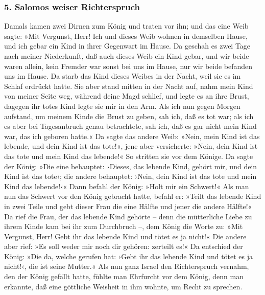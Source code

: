 \hypertarget{salomos-weiser-richterspruch}{%
\subsubsection{5. Salomos weiser
Richterspruch}\label{salomos-weiser-richterspruch}}

Damals kamen zwei Dirnen zum König und traten vor ihn;
und das eine Weib sagte: »Mit Vergunst, Herr! Ich und
dieses Weib wohnen in demselben Hause, und ich gebar ein Kind in ihrer
Gegenwart im Hause. Da geschah es zwei Tage nach meiner
Niederkunft, daß auch dieses Weib ein Kind gebar, und wir beide waren
allein, kein Fremder war sonst bei uns im Hause, nur wir beide befanden
uns im Hause. Da starb das Kind dieses Weibes in der
Nacht, weil sie es im Schlaf erdrückt hatte. Sie aber
stand mitten in der Nacht auf, nahm mein Kind von meiner Seite weg,
während deine Magd schlief, und legte es an ihre Brust, dagegen ihr
totes Kind legte sie mir in den Arm. Als ich nun gegen
Morgen aufstand, um meinem Kinde die Brust zu geben, sah ich, daß es tot
war; als ich es aber bei Tagesanbruch genau betrachtete, sah ich, daß es
gar nicht mein Kind war, das ich geboren hatte.« Da sagte
das andere Weib: »Nein, mein Kind ist das lebende, und dein Kind ist das
tote!«, jene aber versicherte: »Nein, dein Kind ist das tote und mein
Kind das lebende!« So stritten sie vor dem Könige. Da
sagte der König: »Die eine behauptet: ›Dieses, das lebende Kind, gehört
mir, und dein Kind ist das tote‹; die andere behauptet: ›Nein, dein Kind
ist das tote und mein Kind das lebende!‹« Dann befahl der
König: »Holt mir ein Schwert!« Als man nun das Schwert vor den König
gebracht hatte, befahl er: »Teilt das lebende Kind in
zwei Teile und gebt dieser Frau die eine Hälfte und jener die andere
Hälfte!« Da rief die Frau, der das lebende Kind gehörte
-- denn die mütterliche Liebe zu ihrem Kinde kam bei ihr zum Durchbruch
--, dem König die Worte zu: »Mit Vergunst, Herr! Gebt ihr das lebende
Kind und tötet es ja nicht!« Die andere aber rief: »Es soll weder mir
noch dir gehören: zerteilt es!« Da entschied der König:
»Die da, welche gerufen hat: ›Gebt ihr das lebende Kind und tötet es ja
nicht!‹, die ist seine Mutter.« Als nun ganz Israel den
Richterspruch vernahm, den der König gefällt hatte, fühlte man Ehrfurcht
vor dem König, denn man erkannte, daß eine göttliche Weisheit in ihm
wohnte, um Recht zu sprechen.

